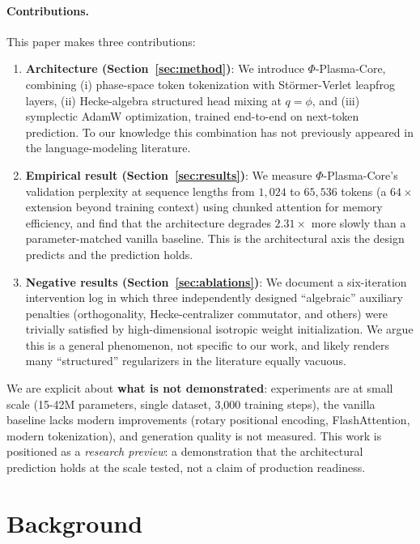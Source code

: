 \documentclass[11pt]{article}
\newcommand{\phigold}{\phi}
\begin{document}
\paragraph{Contributions.} This paper makes three contributions:
\begin{enumerate}[leftmargin=*]
\item \textbf{Architecture (Section~\ref{sec:method})}: We introduce $\Phi$-Plasma-Core,
combining (i) phase-space token tokenization with Störmer-Verlet leapfrog layers,
(ii) Hecke-algebra structured head mixing at $q = \phigold$, and
(iii) symplectic AdamW optimization, trained end-to-end on next-token prediction.
To our knowledge this combination has not previously appeared in the language-modeling
literature.
\item \textbf{Empirical result (Section~\ref{sec:results})}: We measure
$\Phi$-Plasma-Core's validation perplexity at sequence lengths from
$1{,}024$ to $65{,}536$ tokens (a $64\times$ extension beyond training context)
using chunked attention for memory efficiency, and find that the architecture
degrades $2.31\times$ more slowly than a parameter-matched vanilla baseline.
This is the architectural axis the design predicts and the prediction holds.
\item \textbf{Negative results (Section~\ref{sec:ablations})}: We document a
six-iteration intervention log in which three independently designed
``algebraic'' auxiliary penalties (orthogonality, Hecke-centralizer commutator,
and others) were trivially satisfied by high-dimensional isotropic weight
initialization. We argue this is a general phenomenon, not specific to our work,
and likely renders many ``structured'' regularizers in the literature equally vacuous.
\end{enumerate}

We are explicit about \textbf{what is not demonstrated}: experiments are at
small scale (15-42M parameters, single dataset, 3{,}000 training steps), the
vanilla baseline lacks modern improvements (rotary positional encoding,
FlashAttention, modern tokenization), and generation quality is not measured.
This work is positioned as a \emph{research preview}: a demonstration that
the architectural prediction holds at the scale tested, not a claim of
production readiness.

\section{Background}
\label{sec:background}
\end{document}
